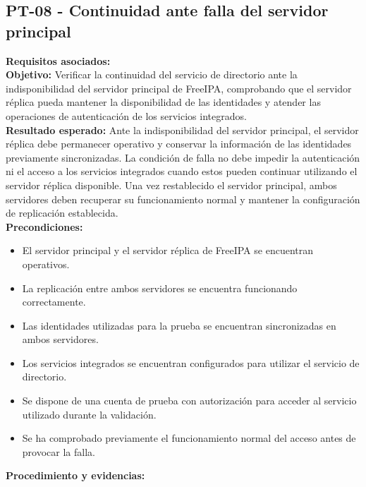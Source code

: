 \subsection{PT-08 - Continuidad ante falla del servidor principal}\label{subsec:pt08}
\textbf{Requisitos asociados:}\\
\textbf{Objetivo:} Verificar la continuidad del servicio de directorio ante la indisponibilidad del servidor principal de FreeIPA, comprobando que el servidor réplica pueda mantener la disponibilidad de las identidades y atender las operaciones de autenticación de los servicios integrados.\\
\textbf{Resultado esperado:} Ante la indisponibilidad del servidor principal, el servidor réplica debe permanecer operativo y conservar la información de las identidades previamente sincronizadas.
La condición de falla no debe impedir la autenticación ni el acceso a los servicios integrados cuando estos pueden continuar utilizando el servidor réplica disponible.
Una vez restablecido el servidor principal, ambos servidores deben recuperar su funcionamiento normal y mantener la configuración de replicación establecida.\\
\textbf{Precondiciones:}
\begin{itemize}
	\item El servidor principal y el servidor réplica de FreeIPA se encuentran operativos.
	\item La replicación entre ambos servidores se encuentra funcionando correctamente.
	\item Las identidades utilizadas para la prueba se encuentran sincronizadas en ambos servidores.
	\item Los servicios integrados se encuentran configurados para utilizar el servicio de directorio.
	\item Se dispone de una cuenta de prueba con autorización para acceder al servicio utilizado durante la validación.
	\item Se ha comprobado previamente el funcionamiento normal del acceso antes de provocar la falla.
\end{itemize}
\textbf{Procedimiento y evidencias:}
